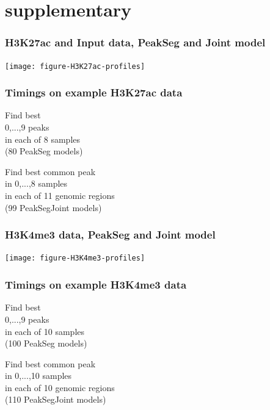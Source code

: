 \documentclass{beamer}
\begin{document}
\section*{supplementary}

\begin{frame}
  \frametitle{H3K27ac and Input data, PeakSeg and Joint model}

  \texttt{[image: figure-H3K27ac-profiles]}
\end{frame}

\begin{frame}
  \frametitle{Timings on example H3K27ac data}

  \scriptsize

  \parbox{2in}{
    Find best \\
  0,...,9 peaks\\
  in each of 8 samples\\
  (80 PeakSeg models)

  
  }
  \parbox{2in}{
  Find best common peak\\
  in 0,...,8 samples\\
  in each of 11 genomic regions\\
  (99 PeakSegJoint models)

  
  }

\end{frame}

\begin{frame}
  \frametitle{H3K4me3 data, PeakSeg and Joint model}

  \texttt{[image: figure-H3K4me3-profiles]}
\end{frame}

\begin{frame}
  \frametitle{Timings on example H3K4me3 data}

  \small

\parbox{1.5in}{
  Find best \\
  0,...,9 peaks\\
  in each of 10 samples\\
  (100 PeakSeg models)

  
}
\parbox{2in}{
  Find best common peak\\
  in 0,...,10 samples\\
  in each of 10 genomic regions\\
  (110 PeakSegJoint models)

  
}

\end{frame}
\end{document}
